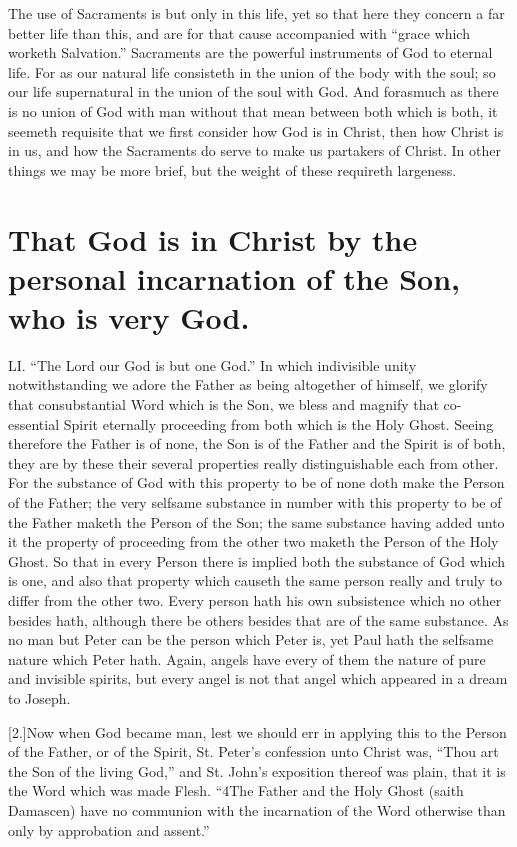 The use of Sacraments is but only in this life, yet so that here they concern a far better life than this, and are for that cause accompanied with “grace which worketh Salvation.” Sacraments are the powerful instruments of God to eternal life. For as our natural life consisteth in the union of the body with the soul; so our life supernatural in the union of the soul with God. And forasmuch as there is no union of God with man without that mean between both which is both, it seemeth requisite that we first consider how God is in Christ, then how Christ is in us, and how the Sacraments do serve to make us partakers of Christ. In other things we may be more brief, but the weight of these requireth largeness.


\section*{That God is in Christ by the personal incarnation of the Son, who is very God.}
LI. “The Lord our God is but one God.” In which indivisible unity notwithstanding we adore the Father as being altogether of himself, we glorify that consubstantial Word which is the Son, we bless and magnify that co-essential Spirit eternally proceeding from both which is the Holy Ghost. Seeing therefore the Father is of none, the Son is of the Father and the Spirit is of both, they are by these their several properties really distinguishable each from other. For the substance of God with this property to be of none doth make the Person of the Father; the very selfsame substance in number with this property to be of the Father maketh the Person of the Son; the same substance having added unto it the property of proceeding from the other two maketh the Person of the Holy Ghost. So that in every Person there is implied both the substance of God which is one, and  also that property which causeth the same person really and truly to differ from the other two.
 Every person hath his own subsistence which no other besides hath, although there be others besides that are of the same substance. As no man but Peter can be the person which Peter is, yet Paul hath the selfsame nature which Peter hath. Again, angels have every of them the nature of pure and invisible spirits, but every angel is not that angel which appeared in a dream to Joseph.

[2.]Now when God became man, lest we should err in applying this to the Person of the Father, or of the Spirit, St. Peter’s confession unto Christ was, “Thou art the Son of the living God,” and St. John’s exposition thereof was plain, that it is the Word which was made Flesh. “4The Father and the Holy Ghost (saith Damascen) have no communion with the incarnation of the Word otherwise than only by approbation and assent.”

